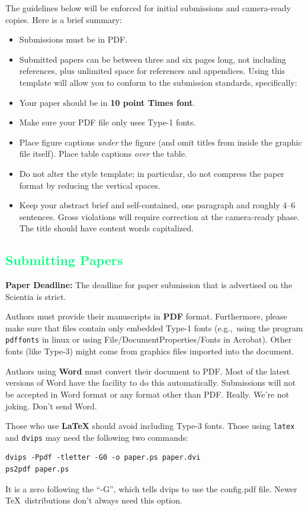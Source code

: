 \documentclass{article}
\newcommand{\csubsection}[1]{\subsection{\textcolor{springgreen}{#1}}}
\begin{document}
The guidelines below will be enforced for initial submissions and
camera-ready copies. Here is a brief summary:
\begin{itemize}
\item Submissions must be in PDF\@.
\item Submitted papers can be between three and six pages long, not including references, plus unlimited space for references and appendices. Using this template will allow you to conform to the submission standards, specifically:
\item Your paper should be in \textbf{10 point Times font}.
\item Make sure your PDF file only uses Type-1 fonts.
\item Place figure captions \emph{under} the figure (and omit titles from inside
    the graphic file itself). Place table captions \emph{over} the table.
\item Do not alter the style template; in particular, do not compress the paper format by reducing the vertical spaces.
\item Keep your abstract brief and self-contained, one paragraph and roughly
    4--6 sentences. Gross violations will require correction at the
    camera-ready phase. The title should have content words capitalized.
\end{itemize}

\csubsection{Submitting Papers}

\textbf{Paper Deadline:} The deadline for paper submission that is
advertised on the Scientia is strict.

\medskip

Authors must provide their manuscripts in \textbf{PDF} format.
Furthermore, please make sure that files contain only embedded Type-1 fonts
(e.g.,~using the program \texttt{pdffonts} in linux or using
File/DocumentProperties/Fonts in Acrobat). Other fonts (like Type-3)
might come from graphics files imported into the document.

Authors using \textbf{Word} must convert their document to PDF\@. Most
of the latest versions of Word have the facility to do this
automatically. Submissions will not be accepted in Word format or any
format other than PDF\@. Really. We're not joking. Don't send Word.

Those who use \textbf{\LaTeX} should avoid including Type-3 fonts.
Those using \texttt{latex} and \texttt{dvips} may need the following
two commands:

{\footnotesize
\begin{verbatim}
dvips -Ppdf -tletter -G0 -o paper.ps paper.dvi
ps2pdf paper.ps
\end{verbatim}}
It is a zero following the ``-G'', which tells dvips to use
the config.pdf file. Newer \TeX\ distributions don't always need this
option.
\end{document}
